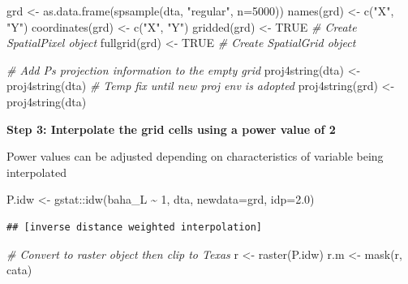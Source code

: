 \documentclass[
]{book}
\newenvironment{Shaded}{\begin{snugshade}}{\end{snugshade}}
\newcommand{\AttributeTok}[1]{\textcolor[rgb]{0.77,0.63,0.00}{#1}}
\newcommand{\CommentTok}[1]{\textcolor[rgb]{0.56,0.35,0.01}{\textit{#1}}}
\newcommand{\ConstantTok}[1]{\textcolor[rgb]{0.00,0.00,0.00}{#1}}
\newcommand{\DecValTok}[1]{\textcolor[rgb]{0.00,0.00,0.81}{#1}}
\newcommand{\FloatTok}[1]{\textcolor[rgb]{0.00,0.00,0.81}{#1}}
\newcommand{\FunctionTok}[1]{\textcolor[rgb]{0.00,0.00,0.00}{#1}}
\newcommand{\NormalTok}[1]{#1}
\newcommand{\OtherTok}[1]{\textcolor[rgb]{0.56,0.35,0.01}{#1}}
\newcommand{\SpecialCharTok}[1]{\textcolor[rgb]{0.00,0.00,0.00}{#1}}
\newcommand{\StringTok}[1]{\textcolor[rgb]{0.31,0.60,0.02}{#1}}
\begin{document}
\begin{Shaded}
\begin{Highlighting}[]
\NormalTok{grd              }\OtherTok{\textless{}{-}} \FunctionTok{as.data.frame}\NormalTok{(}\FunctionTok{spsample}\NormalTok{(dta, }\StringTok{"regular"}\NormalTok{, }\AttributeTok{n=}\DecValTok{5000}\NormalTok{))}
\FunctionTok{names}\NormalTok{(grd)       }\OtherTok{\textless{}{-}} \FunctionTok{c}\NormalTok{(}\StringTok{"X"}\NormalTok{, }\StringTok{"Y"}\NormalTok{)}
\FunctionTok{coordinates}\NormalTok{(grd) }\OtherTok{\textless{}{-}} \FunctionTok{c}\NormalTok{(}\StringTok{"X"}\NormalTok{, }\StringTok{"Y"}\NormalTok{)}
\FunctionTok{gridded}\NormalTok{(grd)     }\OtherTok{\textless{}{-}} \ConstantTok{TRUE}  \CommentTok{\# Create SpatialPixel object}
\FunctionTok{fullgrid}\NormalTok{(grd)    }\OtherTok{\textless{}{-}} \ConstantTok{TRUE}  \CommentTok{\# Create SpatialGrid object}

\CommentTok{\# Add P\textquotesingle{}s projection information to the empty grid}
\FunctionTok{proj4string}\NormalTok{(dta) }\OtherTok{\textless{}{-}} \FunctionTok{proj4string}\NormalTok{(dta) }\CommentTok{\# Temp fix until new proj env is adopted}
\FunctionTok{proj4string}\NormalTok{(grd) }\OtherTok{\textless{}{-}} \FunctionTok{proj4string}\NormalTok{(dta)}
\end{Highlighting}
\end{Shaded}

\textbf{Step 3: Interpolate the grid cells using a power value of 2}

Power values can be adjusted depending on characteristics of variable being interpolated

\begin{Shaded}
\begin{Highlighting}[]
\NormalTok{P.idw }\OtherTok{\textless{}{-}}\NormalTok{ gstat}\SpecialCharTok{::}\FunctionTok{idw}\NormalTok{(baha\_L }\SpecialCharTok{\textasciitilde{}} \DecValTok{1}\NormalTok{, dta, }\AttributeTok{newdata=}\NormalTok{grd, }\AttributeTok{idp=}\FloatTok{2.0}\NormalTok{)}
\end{Highlighting}
\end{Shaded}

\begin{verbatim}
## [inverse distance weighted interpolation]
\end{verbatim}

\begin{Shaded}
\begin{Highlighting}[]
\CommentTok{\# Convert to raster object then clip to Texas}
\NormalTok{r       }\OtherTok{\textless{}{-}} \FunctionTok{raster}\NormalTok{(P.idw)}
\NormalTok{r.m     }\OtherTok{\textless{}{-}} \FunctionTok{mask}\NormalTok{(r, cata)}
\end{Highlighting}
\end{Shaded}
\end{document}
